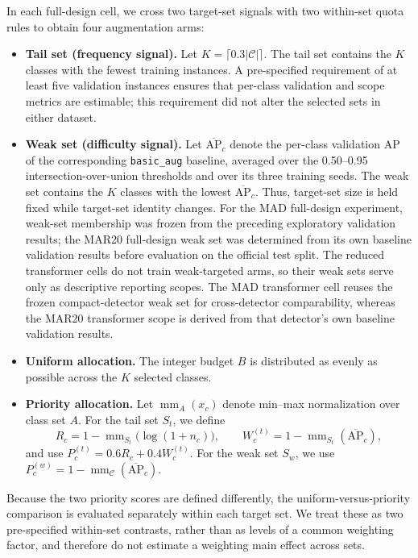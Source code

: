 \documentclass[preprint,12pt,authoryear]{elsarticle}
\begin{document}
In each full-design cell, we cross two target-set signals with two
within-set quota rules to obtain four augmentation arms:
\begin{itemize}
\item \textbf{Tail set (frequency signal).} Let
  $K=\lceil0.3|\mathcal{C}|\rceil$. The tail set contains the $K$
  classes with the fewest training instances. A pre-specified
  requirement of at least five validation instances ensures that
  per-class validation and scope metrics are estimable; this requirement
  did not alter the selected sets in either dataset.
\item \textbf{Weak set (difficulty signal).} Let
  $\overline{\mathrm{AP}}_c$ denote the per-class validation AP of the
  corresponding \texttt{basic\_aug} baseline, averaged over the
  0.50--0.95 intersection-over-union thresholds and over its three
  training seeds. The weak set contains the $K$ classes with the lowest
  $\overline{\mathrm{AP}}_c$. Thus, target-set size is held fixed while
  target-set identity changes. For the MAD full-design experiment,
  weak-set membership was frozen from the preceding exploratory
  validation results; the MAR20 full-design weak set was determined from
  its own baseline validation results before evaluation on the official
  test split. The reduced transformer cells do not train weak-targeted
  arms, so their weak sets serve only as descriptive reporting scopes.
  The MAD transformer cell reuses the frozen compact-detector weak set
  for cross-detector comparability, whereas the MAR20 transformer scope
  is derived from that detector's own baseline validation results.
\item \textbf{Uniform allocation.} The integer budget $B$ is distributed
  as evenly as possible across the $K$ selected classes.
\item \textbf{Priority allocation.} Let
  $\operatorname{mm}_{A}(x_c)$ denote min--max normalization over class
  set $A$. For the tail set $S_t$, we define
  \[
  R_c=1-\operatorname{mm}_{S_t}\!\bigl(\log(1+n_c)\bigr),\qquad
  W_c^{(t)}=1-\operatorname{mm}_{S_t}(\overline{\mathrm{AP}}_c),
  \]
  and use $P_c^{(t)}=0.6R_c+0.4W_c^{(t)}$. For the weak set $S_w$, we
  use $P_c^{(w)}=1-\operatorname{mm}_{\mathcal{C}}
  (\overline{\mathrm{AP}}_c)$.
\end{itemize}
Because the two priority scores are defined differently, the
uniform-versus-priority comparison is evaluated separately within each
target set. We treat these as two pre-specified within-set contrasts,
rather than as levels of a common weighting factor, and therefore do
not estimate a weighting main effect across sets.
\end{document}
